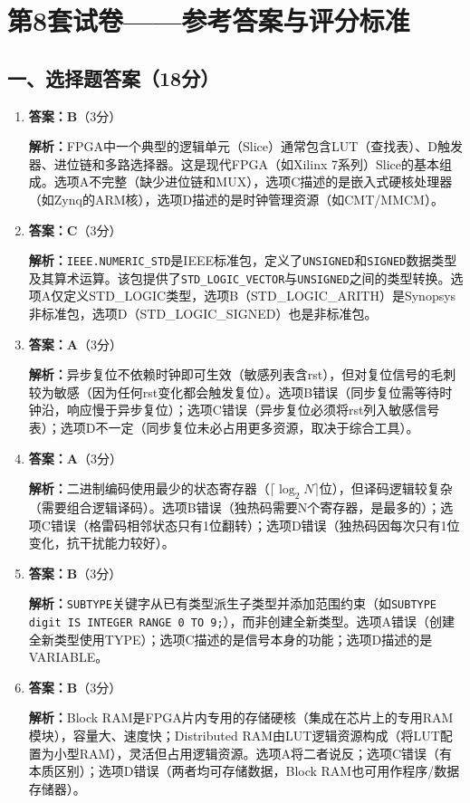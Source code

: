 \chapter{第8套试卷——参考答案与评分标准}

\section{一、选择题答案（18分）}

\begin{enumerate}[label=\arabic*., leftmargin=*]

\item \textbf{答案：B}（3分）

\textbf{解析：}FPGA中一个典型的逻辑单元（Slice）通常包含LUT（查找表）、D触发器、进位链和多路选择器。这是现代FPGA（如Xilinx 7系列）Slice的基本组成。选项A不完整（缺少进位链和MUX），选项C描述的是嵌入式硬核处理器（如Zynq的ARM核），选项D描述的是时钟管理资源（如CMT/MMCM）。

\item \textbf{答案：C}（3分）

\textbf{解析：}\texttt{IEEE.NUMERIC\_STD}是IEEE标准包，定义了\texttt{UNSIGNED}和\texttt{SIGNED}数据类型及其算术运算。该包提供了\texttt{STD\_LOGIC\_VECTOR}与\texttt{UNSIGNED}之间的类型转换。选项A仅定义STD\_LOGIC类型，选项B（STD\_LOGIC\_ARITH）是Synopsys非标准包，选项D（STD\_LOGIC\_SIGNED）也是非标准包。

\item \textbf{答案：A}（3分）

\textbf{解析：}异步复位不依赖时钟即可生效（敏感列表含rst），但对复位信号的毛刺较为敏感（因为任何rst变化都会触发复位）。选项B错误（同步复位需等待时钟沿，响应慢于异步复位）；选项C错误（异步复位必须将rst列入敏感信号表）；选项D不一定（同步复位未必占用更多资源，取决于综合工具）。

\item \textbf{答案：A}（3分）

\textbf{解析：}二进制编码使用最少的状态寄存器（$\lceil\log_2 N\rceil$位），但译码逻辑较复杂（需要组合逻辑译码）。选项B错误（独热码需要N个寄存器，是最多的）；选项C错误（格雷码相邻状态只有1位翻转）；选项D错误（独热码因每次只有1位变化，抗干扰能力较好）。

\item \textbf{答案：B}（3分）

\textbf{解析：}\texttt{SUBTYPE}关键字从已有类型派生子类型并添加范围约束（如\texttt{SUBTYPE digit IS INTEGER RANGE 0 TO 9;}），而非创建全新类型。选项A错误（创建全新类型使用TYPE）；选项C描述的是信号本身的功能；选项D描述的是VARIABLE。

\item \textbf{答案：B}（3分）

\textbf{解析：}Block RAM是FPGA片内专用的存储硬核（集成在芯片上的专用RAM模块），容量大、速度快；Distributed RAM由LUT逻辑资源构成（将LUT配置为小型RAM），灵活但占用逻辑资源。选项A将二者说反；选项C错误（有本质区别）；选项D错误（两者均可存储数据，Block RAM也可用作程序/数据存储器）。

\end{enumerate}

